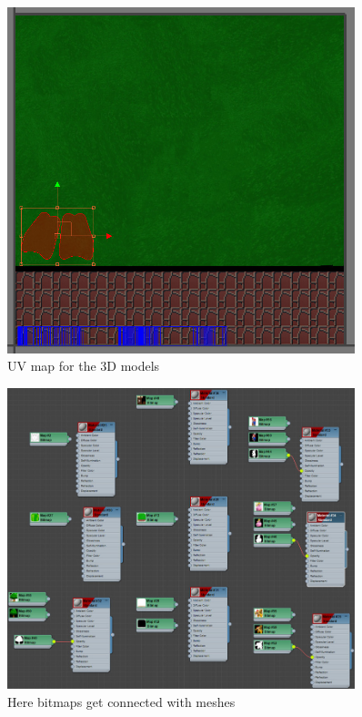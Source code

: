 \documentclass[11.5pt,oneside,a4paper]{scrartcl}
\newcounter{ct}
\begin{document}
\begin{figure}
	\centering
	\includegraphics[width=0.90\textwidth]{texturesfor3dmodel.jpg}
	\caption{UV map for the 3D models}
	\label{fig:texturesfor3dmodel}
	\vspace{0.1cm}
\end{figure}

\begin{figure}
	\centering
	\includegraphics[width=0.90\textwidth]{texturing.jpg}
	\caption{Here bitmaps get connected with meshes}
	\label{fig:texturing}
	\vspace{0.1cm}
\end{figure}
\end{document}
